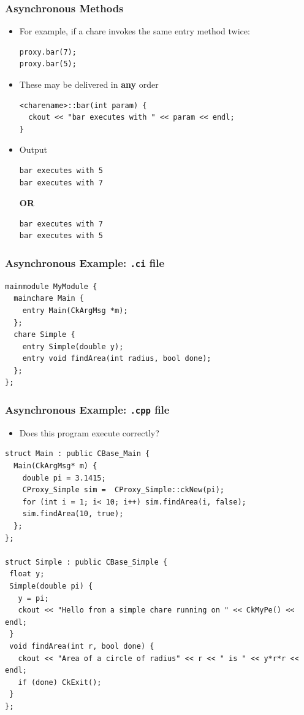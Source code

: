 \begin{frame}[fragile]
  \frametitle{Asynchronous Methods}
  \begin{itemize}
  \item For example, if a chare invokes the same entry method twice:
  \begin{lstlisting}
proxy.bar(7);
proxy.bar(5);
  \end{lstlisting}%
  \item These may be delivered in \textbf{any} order
  \begin{lstlisting}
<charename>::bar(int param) {
  ckout << "bar executes with " << param << endl;
}
\end{lstlisting}
  \item Output
\begin{lstlisting}
bar executes with 5
bar executes with 7
\end{lstlisting}
\textbf{OR}
\begin{lstlisting}
bar executes with 7
bar executes with 5
\end{lstlisting}
  \end{itemize}
\end{frame}


\begin{frame}[fragile]
  \frametitle{Asynchronous Example: \texttt{.ci} file}
\begin{lstlisting}
mainmodule MyModule {
  mainchare Main {
    entry Main(CkArgMsg *m);
  };
  chare Simple {
    entry Simple(double y);
    entry void findArea(int radius, bool done);
  };
};
\end{lstlisting}
\end{frame}

\begin{frame}[fragile]
  \frametitle{Asynchronous Example: \texttt{.cpp} file}
\begin{itemize}
  \item Does this program execute correctly?
\end{itemize}
\scriptsize
\begin{lstlisting}[basicstyle=\footnotesize]
struct Main : public CBase_Main {
  Main(CkArgMsg* m) {
    double pi = 3.1415;
    CProxy_Simple sim =  CProxy_Simple::ckNew(pi);
    for (int i = 1; i< 10; i++) sim.findArea(i, false);
    sim.findArea(10, true);
  };
};

struct Simple : public CBase_Simple {
 float y;
 Simple(double pi) {
   y = pi;
   ckout << "Hello from a simple chare running on " << CkMyPe() << endl;
 }
 void findArea(int r, bool done) {
   ckout << "Area of a circle of radius" << r << " is " << y*r*r << endl;
   if (done) CkExit();
 }
};
\end{lstlisting}
\end{frame}

